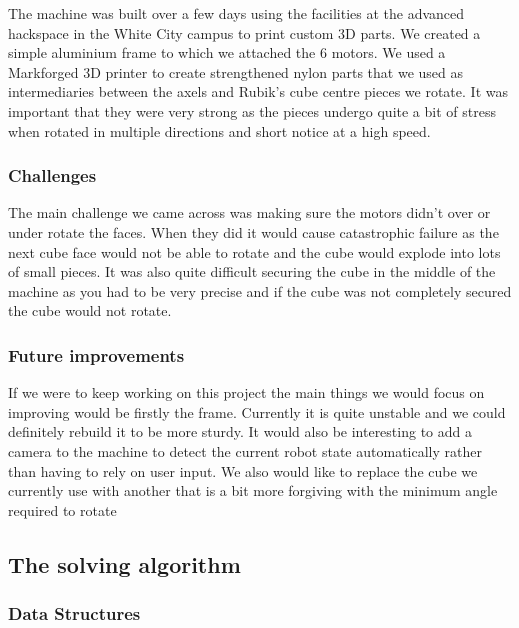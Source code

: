 \documentclass[8pt]{article}
\begin{document}
The machine was built over a few days using the facilities at the advanced 
hackspace in the White City campus to print custom 3D parts. We created a simple
aluminium frame to which we attached the 6 motors. We used a Markforged 
3D printer to create strengthened nylon parts that we used as intermediaries 
between the axels and Rubik's cube centre pieces we rotate. It was important that 
they were very strong as the pieces undergo quite a bit of stress when rotated in 
multiple directions and short notice at a high speed.
\subsubsection{Challenges} 

The main challenge we came across was making sure the motors didn't over or under 
rotate the faces. When they did it would cause catastrophic failure as the next 
cube face would not be able to rotate and the cube would explode into lots of small 
pieces. It was also quite difficult securing the cube in the middle of the machine 
as you had to be very precise and if the cube was not completely secured the cube 
would not rotate.

\subsubsection{Future improvements}

If we were to keep working on this project the main things we would focus 
on improving would be firstly the frame. Currently it is quite unstable and we 
could definitely rebuild it to be more sturdy. It would also be interesting to 
add a camera to the machine to detect the current robot state automatically rather 
than having to rely on user input. We also would like to replace the cube we currently 
use with another that is a bit more forgiving with the minimum angle required to 
rotate

\subsection{The solving algorithm}
\subsubsection{Data Structures}
\end{document}
